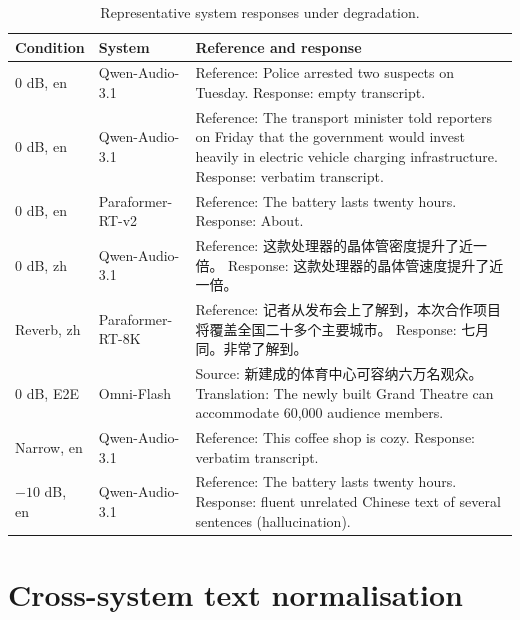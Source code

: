 \begin{table}[h]
\centering
\caption{Representative system responses under degradation.}
\label{tab:examples}
\small
\begin{tabular}{llp{6.1cm}}
\toprule
Condition & System & Reference and response \\
\midrule
0 dB, en & Qwen-Audio-3.1 & Reference: Police arrested two suspects on Tuesday. Response: empty transcript. \\
0 dB, en & Qwen-Audio-3.1 & Reference: The transport minister told reporters on Friday that the government would invest heavily in electric vehicle charging infrastructure. Response: verbatim transcript. \\
0 dB, en & Paraformer-RT-v2 & Reference: The battery lasts twenty hours. Response: About. \\
0 dB, zh & Qwen-Audio-3.1 & Reference: 这款处理器的晶体管密度提升了近一倍。 Response: 这款处理器的晶体管速度提升了近一倍。 \\
Reverb, zh & Paraformer-RT-8K & Reference: 记者从发布会上了解到，本次合作项目将覆盖全国二十多个主要城市。 Response: 七月同。非常了解到。 \\
0 dB, E2E & Omni-Flash & Source: 新建成的体育中心可容纳六万名观众。 Translation: The newly built Grand Theatre can accommodate 60,000 audience members. \\
Narrow, en & Qwen-Audio-3.1 & Reference: This coffee shop is cozy. Response: verbatim transcript. \\
$-10$ dB, en & Qwen-Audio-3.1 & Reference: The battery lasts twenty hours. Response: fluent unrelated Chinese text of several sentences (hallucination). \\
\bottomrule
\end{tabular}
\end{table}

\section{Cross-system text normalisation}
\label{app:normalisation}


